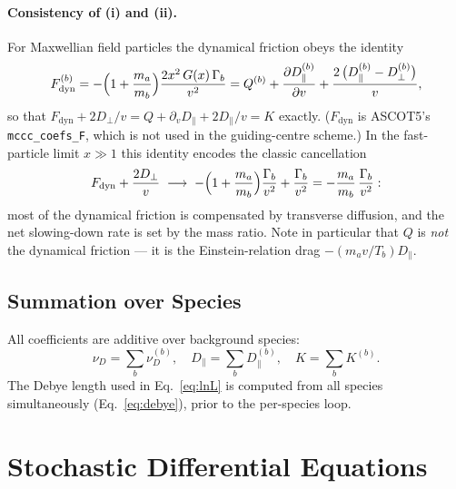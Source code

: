\documentclass[11pt]{article}
\begin{document}
\paragraph{Consistency of (i) and (ii).}
For Maxwellian field particles the dynamical friction obeys the identity
\begin{equation}
  F_{\mathrm{dyn}}^{(b)}
  = -\Bigl(1+\frac{m_a}{m_b}\Bigr)\frac{2x^2\,G(x)\,\Gamma_b}{v^2}
  = Q^{(b)} + \frac{\partial D_{\parallel}^{(b)}}{\partial v}
    + \frac{2\,\bigl(D_{\parallel}^{(b)}-D_{\perp}^{(b)}\bigr)}{v},
  \label{eq:fdyn}
\end{equation}
so that $F_{\mathrm{dyn}} + 2D_{\perp}/v
= Q + \partial_v D_{\parallel} + 2D_{\parallel}/v = K$ exactly.
($F_{\mathrm{dyn}}$ is ASCOT5's \texttt{mccc\_coefs\_F}, which is not used
in the guiding-centre scheme.)  In the fast-particle limit $x \gg 1$ this
identity encodes the classic cancellation
\begin{equation*}
  F_{\mathrm{dyn}} + \frac{2D_{\perp}}{v}
  \;\longrightarrow\;
  -\Bigl(1+\frac{m_a}{m_b}\Bigr)\frac{\Gamma_b}{v^2}
  + \frac{\Gamma_b}{v^2}
  = -\frac{m_a}{m_b}\,\frac{\Gamma_b}{v^2}:
\end{equation*}
most of the dynamical friction is compensated by transverse diffusion, and
the net slowing-down rate is set by the mass ratio.  Note in particular
that $Q$ is \emph{not} the dynamical friction --- it is the
Einstein-relation drag $-(m_a v/T_b)D_{\parallel}$.

\subsection{Summation over Species}

All coefficients are additive over background species:
\begin{equation}
  \nu_D = \sum_b \nu_D^{(b)}, \quad
  D_{\parallel} = \sum_b D_{\parallel}^{(b)}, \quad
  K = \sum_b K^{(b)}.
\end{equation}
The Debye length used in Eq.~\eqref{eq:lnL} is computed from all species
simultaneously (Eq.~\eqref{eq:debye}), prior to the per-species loop.

\section{Stochastic Differential Equations}
\end{document}
